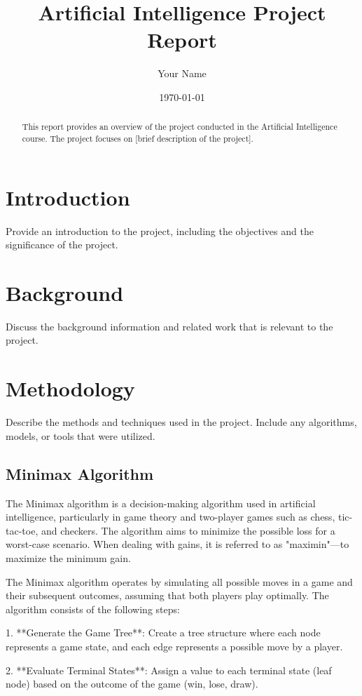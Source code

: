 \documentclass[a4paper,12pt]{article}
\title{Artificial Intelligence Project Report}
\author{Your Name}
\date{\today}
\begin{document}
\maketitle

\begin{abstract}
This report provides an overview of the project conducted in the Artificial Intelligence course. The project focuses on [brief description of the project].
\end{abstract}

\tableofcontents

\section{Introduction}
Provide an introduction to the project, including the objectives and the significance of the project.

\section{Background}
Discuss the background information and related work that is relevant to the project.

\section{Methodology}
Describe the methods and techniques used in the project. Include any algorithms, models, or tools that were utilized.

\subsection{Minimax Algorithm}
The Minimax algorithm is a decision-making algorithm used in artificial intelligence, particularly in game theory and two-player games such as chess, tic-tac-toe, and checkers. The algorithm aims to minimize the possible loss for a worst-case scenario. When dealing with gains, it is referred to as "maximin"—to maximize the minimum gain.

The Minimax algorithm operates by simulating all possible moves in a game and their subsequent outcomes, assuming that both players play optimally. The algorithm consists of the following steps:

1. **Generate the Game Tree**: Create a tree structure where each node represents a game state, and each edge represents a possible move by a player.

2. **Evaluate Terminal States**: Assign a value to each terminal state (leaf node) based on the outcome of the game (win, lose, draw).
\end{document}
